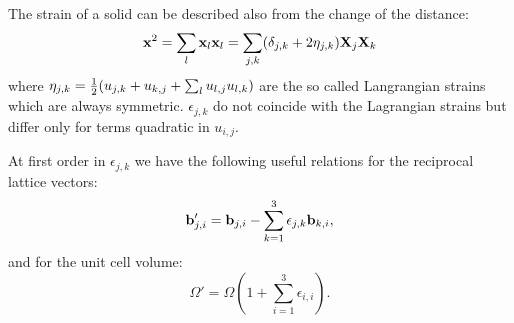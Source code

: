 \documentclass[12pt,a4paper,twoside]{report}
\begin{document}
The strain of a solid can be described also from the change of the
distance:
\begin{equation}
{\bf x}^2=\sum_l {\bf x}_l {\bf x}_l = \sum_{j,k}(\delta_{j,k} +
2 \eta_{j,k}) {\bf X}_j {\bf X}_k 
\end{equation}
where $\eta_{j,k}={1\over 2} ( u_{j,k} + u_{k,j} + \sum_l u_{l,j}u_{l,k})$ 
are the so called Langrangian strains which are always symmetric.
$\epsilon_{j,k}$ do not coincide with the Lagrangian strains but
differ only for terms quadratic in $u_{i,j}$. 

At first order in $\epsilon_{j,k}$ we have
the following useful relations for the reciprocal lattice vectors:
\begin{equation}
{\bf b}'_{j,i} = {\bf b}_{j,i} -  \sum_{k=1}^3 \epsilon_{j,k} {\bf b}_{k,i},
\end{equation}
and for the unit cell volume:
\begin{equation}
\Omega'=\Omega \left( 1+\sum_{i=1}^3 \epsilon_{i,i} \right).
\end{equation}
\end{document}

